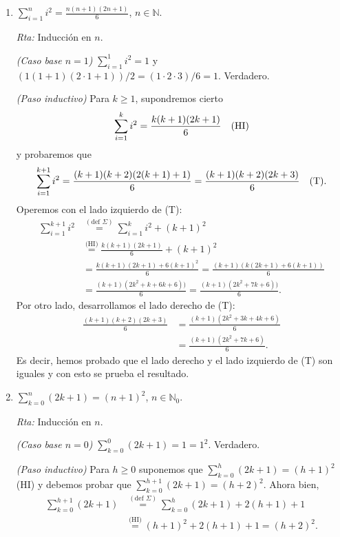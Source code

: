 \documentclass[12pt,spanish,makeidx]{amsbook}
\newcommand{\rta}{\noindent\textit{Rta: }}
\begin{document}
\begin{enumerate}
\begin{enumerate}
			\item\label{ej-sum-i2}  $\displaystyle{ \sum_{i=1}^n i^2 = \frac{n(n+1)(2n+1)}{6}}$, $n\in \mathbb N$.
			
			\rta Inducción en $n$.
			
			\textit{(Caso base $n=1$) } $ \sum_{i=1}^1 i^2 = 1$ y $(1  (1+1)  (2\cdot 1 + 1))/2 = (1 \cdot 2 \cdot 3)/6=1$. Verdadero.  
			
			\textit{(Paso inductivo) } Para  $k \ge 1$,  supondremos cierto 
			$$\sum_{i=1}^{k} i^2 = \frac{k(k+1)(2k+1)}{6} \text{\quad (HI)}$$
			y probaremos que 
			$$\sum_{i=1}^{k+1} i^2 = \frac{(k+1)(k+2)(2(k+1)+1)}{6} = \frac{(k+1)(k+2)(2k+3)}{6} \text{\quad (T)}.$$ 
			Operemos con el lado izquierdo de (T):
			\begin{align*}
			\sum_{i=1}^{k+1} i^2 &\overset{(\text{def } \Sigma)}{=} \sum_{i=1}^{k} i^2 + (k+1)^2 \\ &\overset{\text{(HI)}}{=} \frac{k(k+1)(2k+1)}{6}  + (k+1)^2 \\ &=   \frac{k(k+1)(2k+1) + 6(k+1)^2}{6} = \frac{(k+1)(k(2k+1) + 6(k+1))}{6} \\ &= \frac{(k+1)(2k^2+k + 6k+6))}{6} =  \frac{(k+1)(2k^2+7k+6))}{6}.
			\end{align*}
			Por otro lado,  desarrollamos el lado derecho de (T): 
			\begin{align*}
				\frac{(k+1)(k+2)(2k+3)}{6} &= \frac{(k+1)(2k^2+3k +4k +6)}{6} \\&= \frac{(k+1)(2k^2+7k +6)}{6}.
			\end{align*}
			Es decir,  hemos probado que el lado derecho y el lado izquierdo de (T) son iguales y con esto se prueba el resultado. 
			
			\item  $\displaystyle{ \sum_{k=0}^n (2k+1) = (n+1)^2}$, $n\in \mathbb N_0$.
			
			\rta Inducción en $n$.
			
			\textit{(Caso base $n=0$) } $\sum_{k=0}^0 (2k+1) = 1 = 1^2$. Verdadero.
			
			\textit{(Paso inductivo) } Para $h \ge 0$ suponemos que $\sum_{k=0}^h (2k+1) = (h+1)^2$ (HI) y debemos probar que $\sum_{k=0}^{h+1} (2k+1) = (h+2)^2$. Ahora bien, 
			\begin{align*}
				\sum_{k=0}^{h+1} (2k+1) &\overset{(\text{def } \Sigma)}{=} \sum_{k=0}^h (2k+1) + 2(h+1) +1 \\ &\overset{\text{(HI)}}{=}  (h+1)^2 + 2(h+1) +1 = (h+2)^2.
			\end{align*}
			

\end{enumerate}
\end{enumerate}
\end{document}

